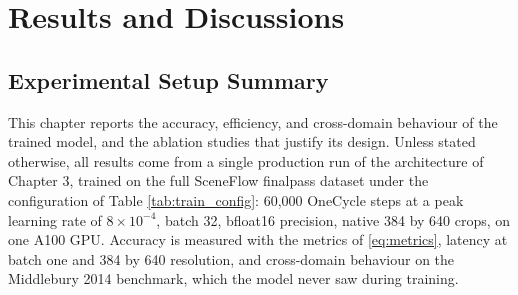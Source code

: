 \chapter{Results and Discussions}

\section{Experimental Setup Summary}
This chapter reports the accuracy, efficiency, and cross-domain behaviour
of the trained model, and the ablation studies that justify its design.
Unless stated otherwise, all results come from a single production run of
the architecture of Chapter 3, trained on the full SceneFlow finalpass
dataset under the configuration of Table \ref{tab:train_config}: 60,000
OneCycle steps at a peak learning rate of $8 \times 10^{-4}$, batch 32,
bfloat16 precision, native 384 by 640 crops, on one A100 GPU. Accuracy is
measured with the metrics of \eqref{eq:metrics}, latency at batch one and
384 by 640 resolution, and cross-domain behaviour on the Middlebury 2014
benchmark, which the model never saw during training.

